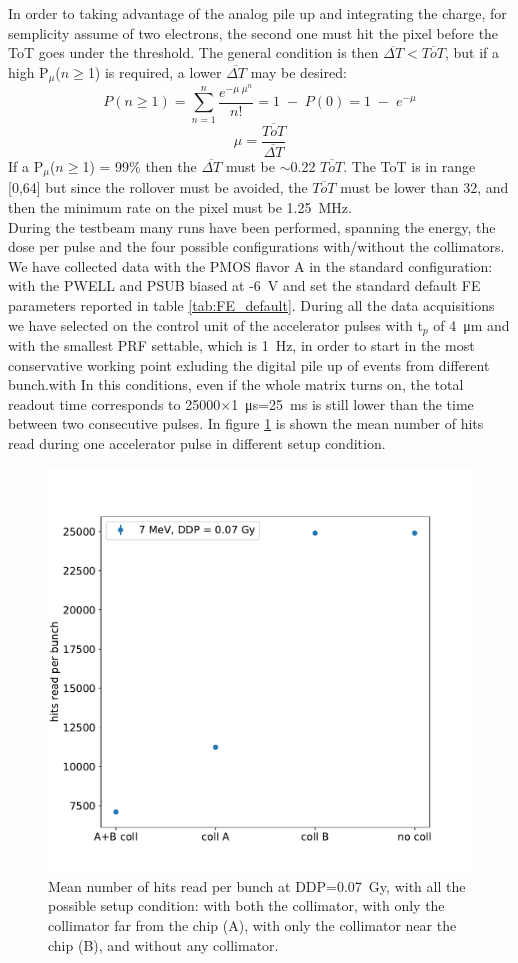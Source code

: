    In order to taking advantage of the analog pile up and integrating the charge, for semplicity assume of two electrons, the second one must hit the pixel before the ToT goes under the threshold. The general condition is then $\overline{\Delta T}<\overline{ToT}$, but if a high P$_\mu$($n\geqslant$1) is required, a lower $\overline{\Delta T}$ may be desired:
   \begin{equation}
      P(n\geqslant1) = \sum\limits_{n=1}^n \frac{e^{-\mu\;\mu^n}}{n!} = 1\;-\;P(0) = 1\;-\;e^{-\mu}
   \end{equation}
   \begin{equation}
      \mu = \frac{\overline{ToT}}{\overline{\Delta T}}
   \end{equation}
   If a P$_\mu$($n\geqslant$1) = 99\% then the $\overline{\Delta T}$ must be $\sim$0.22 $\overline{ToT}$. The ToT is in range [0,64] but since the rollover must be avoided, the $\overline{ToT}$ must be lower than 32, and then the minimum rate on the pixel must be \SI{1.25}{\MHz}. \\

   During the testbeam many runs have been performed, spanning the energy, the dose per pulse and the four possible configurations with/without the collimators. 
   We have collected data with the PMOS flavor A in the standard configuration: with the PWELL and PSUB biased at -\SI{6}{V} and set the standard default FE parameters reported in table \ref{tab:FE_default}.
   During all the data acquisitions we have selected on the control unit of the accelerator pulses with t$_p$ of \SI{4}{\um} and with the smallest PRF settable, which is \SI{1}{Hz}, in order to start in the most conservative working point exluding the digital pile up of events from different bunch.with In this conditions, even if the whole matrix turns on, the total readout time corresponds to 25000$\times$\SI{1}{\us}=\SI{25}{ms} is still lower than the time between two consecutive pulses.
   In figure \ref{fig:hits_FLASH} is shown the mean number of hits read during one accelerator pulse in different setup condition.
   \begin{figure}
      \centering
      \includegraphics[width=.49\linewidth]{figures/test_beam/hits.pdf}
      \caption{Mean number of hits read per bunch at DDP=\SI{0.07}{Gy}, with all the possible setup condition: with both the collimator, with only the collimator far from the chip (A), with only the collimator near the chip (B), and without any collimator.}
      \label{fig:hits_FLASH}
   \end{figure}


